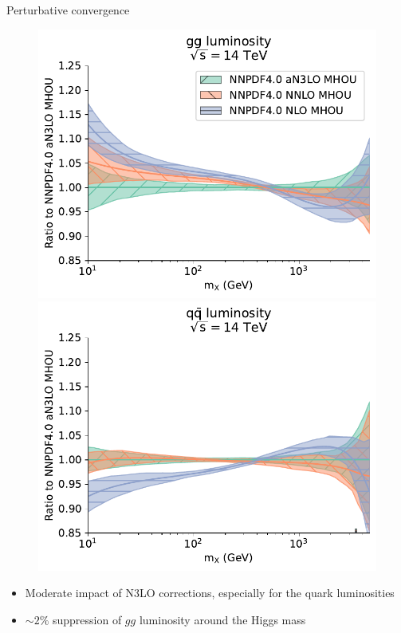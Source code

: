 \begin{frame}{Perturbative convergence}
  \begin{figure}[!t]
    \includegraphics[width=.4\textwidth]{figures/gg_plot_lumi1d_convergence.pdf}
    \includegraphics[width=.4\textwidth]{figures/qqbar_plot_lumi1d_convergence.pdf}
  \end{figure}
  \begin{itemize}
    \item Moderate impact of N3LO corrections, especially for the quark luminosities
    \item $\sim2\%$ suppression of $gg$ luminosity around the Higgs mass
  \end{itemize}
\end{frame}


